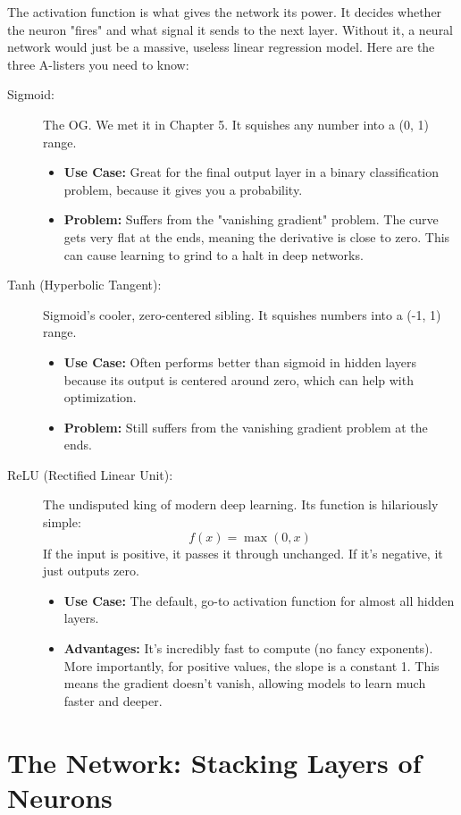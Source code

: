 \documentclass[11pt, letterpaper, openany]{book}
\begin{document}
The activation function is what gives the network its power. It decides whether the neuron "fires" and what signal it sends to the next layer. Without it, a neural network would just be a massive, useless linear regression model. Here are the three A-listers you need to know:
\begin{description}
    \item[Sigmoid:] The OG. We met it in Chapter 5. It squishes any number into a (0, 1) range.
    \begin{itemize}
        \item \textbf{Use Case:} Great for the final output layer in a binary classification problem, because it gives you a probability.
        \item \textbf{Problem:} Suffers from the "vanishing gradient" problem. The curve gets very flat at the ends, meaning the derivative is close to zero. This can cause learning to grind to a halt in deep networks.
    \end{itemize}
    \item[Tanh (Hyperbolic Tangent):] Sigmoid's cooler, zero-centered sibling. It squishes numbers into a (-1, 1) range.
    \begin{itemize}
        \item \textbf{Use Case:} Often performs better than sigmoid in hidden layers because its output is centered around zero, which can help with optimization.
        \item \textbf{Problem:} Still suffers from the vanishing gradient problem at the ends.
    \end{itemize}
    \item[ReLU (Rectified Linear Unit):] The undisputed king of modern deep learning. Its function is hilariously simple:
    \[ f(x) = \max(0, x) \]
    If the input is positive, it passes it through unchanged. If it's negative, it just outputs zero.
    \begin{itemize}
        \item \textbf{Use Case:} The default, go-to activation function for almost all hidden layers.
        \item \textbf{Advantages:} It's incredibly fast to compute (no fancy exponents). More importantly, for positive values, the slope is a constant 1. This means the gradient doesn't vanish, allowing models to learn much faster and deeper.
    \end{itemize}
\end{description}

\section{The Network: Stacking Layers of Neurons}
\end{document}
